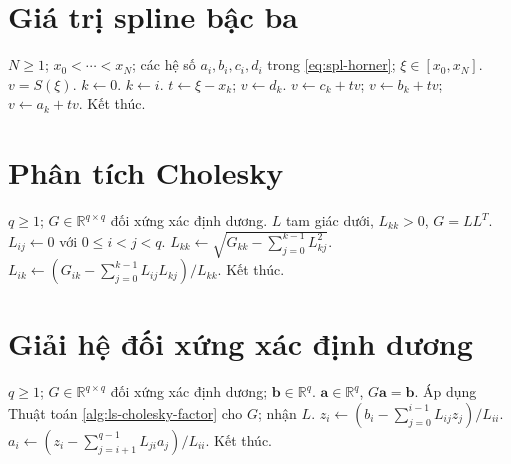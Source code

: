 \documentclass[12pt,a4paper,oneside]{book}
\numberwithin{algorithm}{chapter}
\theoremstyle{definition}
\newcommand{\R}{\mathbb{R}}
\begin{document}
\section{Giá trị spline bậc ba}
\begin{algorithm}[H]
\caption{Chọn đoạn và tính giá trị bằng Horner}
\label{alg:spl-evaluate}
\begin{algorithmic}[1]
\Require $N\geq1$; $x_0<\cdots<x_N$; các hệ số $a_i,b_i,c_i,d_i$ trong \eqref{eq:spl-horner}; $\xi\in[x_0,x_N]$.
\Ensure $v=S(\xi)$.
\State $k\gets0$.
    \State $k\gets i$.
  \EndIf
\EndFor
\Statex
\State $t\gets\xi-x_k$; $v\gets d_k$.
\State $v\gets c_k+tv$; $v\gets b_k+tv$; $v\gets a_k+tv$.
\State Kết thúc.
\end{algorithmic}
\end{algorithm}

\section{Phân tích Cholesky}
\begin{algorithm}[H]
\caption{Dựng nhân tử tam giác dưới Cholesky}
\label{alg:ls-cholesky-factor}
\begin{algorithmic}[1]
\Require $q\geq1$; $G\in\R^{q\times q}$ đối xứng xác định dương.
\Ensure $L$ tam giác dưới, $L_{kk}>0$, $G=LL^T$.
\State $L_{ij}\gets0$ với $0\leq i<j<q$.
  \State $L_{kk}\gets\sqrt{G_{kk}-\sum_{j=0}^{k-1}L_{kj}^2}$.
    \State $L_{ik}\gets(G_{ik}-\sum_{j=0}^{k-1}L_{ij}L_{kj})/L_{kk}$.
  \EndFor
\EndFor
\Statex
\State Kết thúc.
\end{algorithmic}
\end{algorithm}

\section{Giải hệ đối xứng xác định dương}
\begin{algorithm}[H]
\caption{Giải hệ bằng Cholesky -- sơ lược}
\label{alg:ls-cholesky-solve}
\begin{algorithmic}[1]
\Require $q\geq1$; $G\in\R^{q\times q}$ đối xứng xác định dương; $\mathbf b\in\R^q$.
\Ensure $\mathbf a\in\R^q$, $G\mathbf a=\mathbf b$.
\State Áp dụng Thuật toán \ref{alg:ls-cholesky-factor} cho $G$; nhận $L$.
  \State $z_i\gets(b_i-\sum_{j=0}^{i-1}L_{ij}z_j)/L_{ii}$.
\EndFor
\Statex
{}
  \State $a_i\gets(z_i-\sum_{j=i+1}^{q-1}L_{ji}a_j)/L_{ii}$.
\EndFor
\Statex
\State Kết thúc.
\end{algorithmic}
\end{algorithm}
\end{document}
